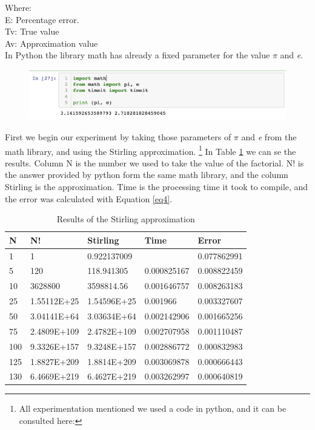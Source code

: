 \documentclass{article}
\begin{document}
Where: \\

E: Percentage error.\\
Tv: True value\\
Av: Approximation value\\

In Python the library math has already a fixed parameter for the value $\pi$ and \textit{e}.

\begin{figure}[htp]
	\centering
	\includegraphics[width=\linewidth]{math.png}
	\label{meatj}
\end{figure}

First we begin our experiment by taking those parameters of $\pi$ and \textit{e} from the math library, and using the Stirling approximation. \footnote{All experimentation mentioned we used a code in python, and it can be consulted here: } In Table \ref{ta1} we can se the results. Column N is the number we used to take the value of the factorial. N! is the answer provided by python form the same math library, and the column Stirling is the approximation. Time is the processing time it took to compile, and the error was calculated with Equation \ref{eq4}.

\begin{table}[h!]
\centering
 \caption{Results of the Stirling approximation} 
 \label{ta1}
 \begin{tabular} {| l | l | l | l | l |}
 \hline
\textbf{N}	&	\textbf{N!}	&	\textbf{Stirling} 	&	\textbf{Time}	&	\textbf{Error}	\\
\hline
1	&	1	&	0.922137009	&		&	0.077862991	\\
\hline
5	&	120	&	118.941305	&	0.000825167	&	0.008822459	\\
\hline
10	&	3628800	&	3598814.56	&	0.001646757	&	0.008263183	\\
\hline
25	&	1.55112E+25	&	1.54596E+25	&	0.001966	&	0.003327607	\\
\hline
50	&	3.04141E+64	&	3.03634E+64	&	0.002142906	&	0.001665256	\\
\hline
75	&	2.4809E+109	&	2.4782E+109	&	0.002707958	&	0.001110487	\\
\hline
100	&	9.3326E+157	&	9.3248E+157	&	0.002886772	&	0.000832983	\\
\hline
125	&	1.8827E+209	&	1.8814E+209	&	0.003069878	&	0.000666443	\\
\hline
130	&	6.4669E+219	&	6.4627E+219	&	0.003262997	&	0.000640819	\\
\hline
 \end{tabular}
 \end{table}
 
\end{document}
